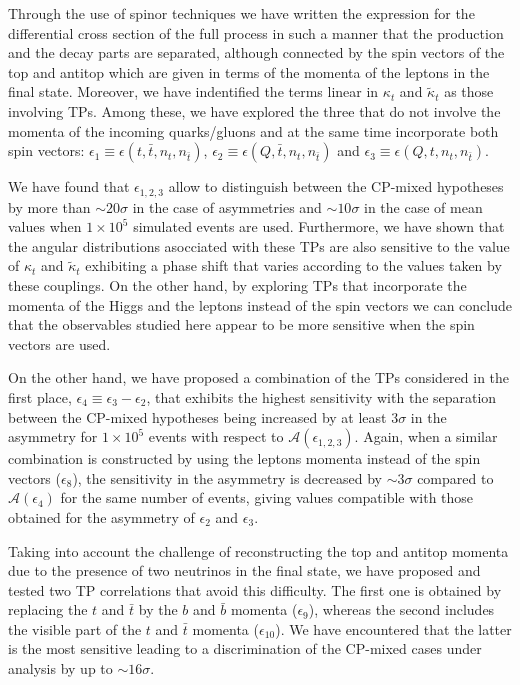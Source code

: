 \documentclass[aps,preprint,tightenlines,floatfix,superscriptaddress,nofootinbib,showpacs]{revtex4-1}
\def\tbar{\bar{t}}
\def\bbar{\bar{b}}
\def\kp{\kappa_t}
\def\kpt{\tilde{\kappa}_t}
\def\TPa{\epsilon(t,\tbar,n_t,n_{\tbar})}
\def\TPb{\epsilon(Q,\tbar,n_t,n_{\tbar})}
\def\TPc{\epsilon(Q,t,n_t,n_{\tbar})}
\begin{document}
Through the use of spinor techniques we have written the expression
for the differential cross section of the full process in such a
manner that the production and the decay parts are separated, although
connected by the spin vectors of the top and antitop which are given
in terms of the momenta of the leptons in the final state. Moreover,
we have indentified the terms linear in $\kp$ and $\kpt$ as those
involving TPs. Among these, we have explored the three that do not
involve the momenta of the incoming quarks/gluons and at the same time
incorporate both spin vectors: $\epsilon_1\equiv \TPa$,
$\epsilon_2\equiv \TPb$ and $\epsilon_3\equiv \TPc$.\par We have found
that $\epsilon_{1,2,3}$ allow to distinguish between the
$\mathrm{CP}$-mixed hypotheses by more than $\sim 20\sigma$ in the
case of asymmetries and $\sim 10\sigma$ in the case of mean values
when $1 \times 10^5$ simulated events are used. Furthermore, we have
shown that the angular distributions asocciated with these TPs are
also sensitive to the value of $\kp$ and $\kpt$ exhibiting a phase
shift that varies according to the values taken by these couplings. On
the other hand, by exploring TPs that incorporate the momenta of the
Higgs and the leptons instead of the spin vectors we can conclude that
the observables studied here appear to be more sensitive when the spin
vectors are used.\par

On the other hand, we have proposed a combination of the TPs
considered in the first place, $\epsilon_4\equiv
\epsilon_3-\epsilon_2$, that exhibits the highest sensitivity with the
separation between the $\mathrm{CP}$-mixed hypotheses being increased
by at least $3\sigma$ in the asymmetry for $1 \times 10^5$ events with
respect to $\mathcal{A}(\epsilon_{1,2,3})$. Again, when a similar
combination is constructed by using the leptons momenta instead of the
spin vectors ($\epsilon_8$), the sensitivity in the asymmetry is
decreased by $\sim 3\sigma$ compared to $\mathcal{A}(\epsilon_4)$ for
the same number of events, giving values compatible with those
obtained for the asymmetry of $\epsilon_2$ and $\epsilon_3$. \par

Taking into account the challenge of reconstructing the top and
antitop momenta due to the presence of two neutrinos in the final
state, we have proposed and tested two TP correlations that avoid this
difficulty. The first one is obtained by replacing the $t$ and $\tbar$
by the $b$ and $\bbar$ momenta ($\epsilon_9$), whereas the second
includes the visible part of the $t$ and $\tbar$ momenta
($\epsilon_{10}$). We have encountered that the latter is the most
sensitive leading to a discrimination of the $\mathrm{CP}$-mixed cases
under analysis by up to $\sim 16\sigma$.\par
\end{document}
